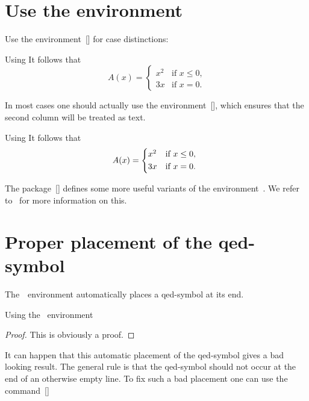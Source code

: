 \section{Use the  environment}

Use the environment~[\envname] for case distinctions:
\begin{showlatex}{Using }
It follows that
\[
  A(x)
  =
  \begin{cases}
    x^2  & \text{if $x \leq 0$,} \\
    3x   & \text{if $x = 0$.}
  \end{cases}
\]
\end{showlatex}
In most cases one should actually use the environment~[\envname], which ensures that the second column will be treated as text.
\begin{showlatex}{Using }
It follows that
\[
  A(x)
  =
  \begin{cases*}
    x^2  & if $x \leq 0$, \\
    3x   & if $x = 0$.
  \end{cases*}
\]
\end{showlatex}

The package~[\packname] defines some more useful variants of the environment~.
We refer to~\cite[3.4.3]{mathtools} for more information on this.




\section{Proper placement of the qed-symbol}


The~~environment automatically places a qed-symbol at its end.
\begin{showlatex}{Using the ~environment}
\begin{proof}
This is obviously a proof.
\end{proof}
\end{showlatex}
It can happen that this automatic placement of the qed-symbol gives a bad looking result.
The general rule is that the qed-symbol should not occur at the end of an otherwise empty line.
To fix such a bad placement one can use the command~[\comname] 

